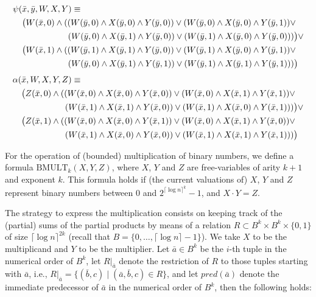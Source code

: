 \documentclass{article}
\begin{document}
\begin{align*}
\psi(&\bar{x}, \bar{y}, W, X, Y) \equiv \\
&\big( W(\bar{x},0) \wedge ( (W(\bar{y},0)\wedge X(\bar{y},0)\wedge Y(\bar{y},0)) \vee (W(\bar{y},0)\wedge X(\bar{y},0)\wedge Y(\bar{y},1))\vee\\
&\hspace*{1.9cm} (W(\bar{y},0)\wedge X(\bar{y},1)\wedge Y(\bar{y},0)) \vee (W(\bar{y},1)\wedge X(\bar{y},0)\wedge Y(\bar{y},0))) \big) \vee \\
&\big( W(\bar{x},1) \wedge ( (W(\bar{y},1)\wedge X(\bar{y},1)\wedge Y(\bar{y},0)) \vee (W(\bar{y},1)\wedge X(\bar{y},0)\wedge Y(\bar{y},1))\vee\\
&\hspace*{1.9cm} (W(\bar{y},0)\wedge X(\bar{y},1)\wedge Y(\bar{y},1)) \vee (W(\bar{y},1)\wedge X(\bar{y},1)\wedge Y(\bar{y},1))) \big) 
\end{align*} 
\begin{align*}
\alpha(&\bar{x}, W, X, Y, Z) \equiv \\
&\big( Z(\bar{x},0) \wedge ( (W(\bar{x},0)\wedge X(\bar{x},0)\wedge Y(\bar{x},0)) \vee (W(\bar{x},0)\wedge X(\bar{x},1)\wedge Y(\bar{x},1))\vee\\
&\hspace*{1.8cm} (W(\bar{x},1)\wedge X(\bar{x},1)\wedge Y(\bar{x},0)) \vee (W(\bar{x},1)\wedge X(\bar{x},0)\wedge Y(\bar{x},1))) \big) \vee \\
&\big( Z(\bar{x},1) \wedge ( (W(\bar{x},0)\wedge X(\bar{x},0)\wedge Y(\bar{x},1)) \vee (W(\bar{x},0)\wedge X(\bar{x},1)\wedge Y(\bar{x},0))\vee\\
&\hspace*{1.8cm} (W(\bar{x},1)\wedge X(\bar{x},0)\wedge Y(\bar{x},0)) \vee (W(\bar{x},1)\wedge X(\bar{x},1)\wedge Y(\bar{x},1))) \big)
\end{align*}

For the operation of (bounded) multiplication of binary numbers, we define a formula $\mathrm{BMULT}_k(X, Y, Z)$, where $X$, $Y$ and $Z$ are free-variables of arity $k+1$ and exponent $k$. This formula holds if (the current valuations of) $X$, $Y$ and $Z$ represent binary numbers between $0$ and $2^{\lceil\log n \rceil^k} - 1$, and $X \cdot Y = Z$. 

The strategy to express the multiplication consists on keeping track of the (partial) sums of the partial products by means of a relation $R \subset B^k \times B^k \times \{0,1\}$ of size $\lceil \log n \rceil^{2k}$ (recall that $B = \{0, \ldots, \lceil \log n \rceil -1\}$). We take $X$ to be the multiplicand and $Y$ to be the multiplier. Let $\bar{a} \in B^k$ be the $i$-th tuple in the numerical order of $B^k$, let $R|_{\bar{a}}$ denote the restriction of $R$ to those tuples starting with $\bar{a}$, i.e., $R|_{\bar{a}} = \{(\bar{b}, c) \mid (\bar{a}, \bar{b}, c) \in R\}$, and let $\mathit{pred}(\bar{a})$ denote the immediate predecessor of $\bar{a}$ in the numerical order of $B^k$, then the following holds:
\end{document}

